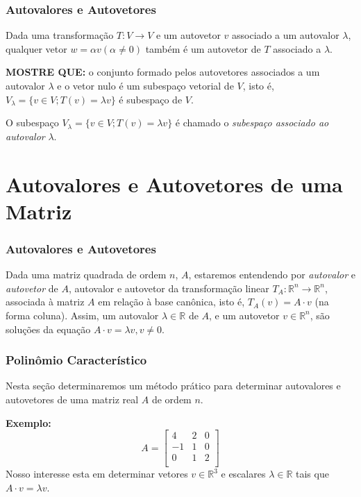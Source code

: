 \documentclass[hyperref={pdfpagelabels=false}]{beamer}
\begin{document}
\begin{frame}
\frametitle{Autovalores e Autovetores}

\begin{theorem}
	Dada uma transformação $T:V \rightarrow V$ e um autovetor $v$ associado a um autovalor $\lambda$, qualquer vetor $w = \alpha v (\alpha \neq 0)$ também é um autovetor de $T$ associado a $\lambda$.
\end{theorem}

\pause 


{\bf MOSTRE QUE:} o conjunto formado pelos autovetores associados a um autovalor $\lambda$ e o vetor nulo é um subespaço vetorial de $V$, isto é, $V_\lambda = \{ v \in V; T(v) = \lambda v \}$ é subespaço de $V$.

\begin{definition}
	O subespaço $V_\lambda = \{ v \in V; T(v) = \lambda v \}$ é chamado o \emph{subespaço associado ao autovalor} $\lambda$.
\end{definition}

\end{frame}

\section{Autovalores e Autovetores de uma Matriz}

\begin{frame}
\frametitle{Autovalores e Autovetores}

Dada uma matriz quadrada de ordem $n$, $A$, estaremos entendendo por \emph{autovalor} e \emph{autovetor} de $A$, autovalor e autovetor da transformação linear $T_A:\mathbb{R}^n \rightarrow \mathbb{R}^n$, associada à matriz $A$ em relação à base canônica, isto é, $T_A (v) = A \cdot v$ (na forma coluna). Assim, um autovalor $\lambda \in \mathbb{R}$ de $A$, e um autovetor $v \in \mathbb{R}^n$, são soluções da equação $A \cdot v = \lambda v, v \neq 0$.

\end{frame}

\begin{frame}
\frametitle{Polinômio Característico}

Nesta seção determinaremos um método prático para determinar autovalores e autovetores de uma matriz real $A$ de ordem $n$.

\pause

{\bf Exemplo: }
$$A = \left[
\begin{array}{ccc}
4	&	2	&	0\\
-1	&	1	&	0 \\
0	&	1	&	2	\\
\end{array}
\right]$$
Nosso interesse esta em determinar vetores $v \in \mathbb{R}^3$ e escalares $\lambda \in \mathbb{R}$ tais que $A \cdot v = \lambda v$.
\end{frame}
\end{document}
